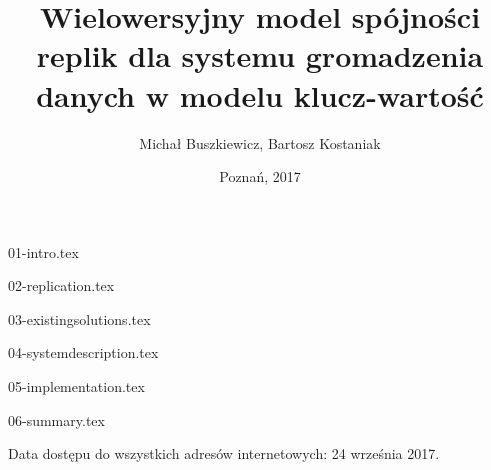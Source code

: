 \documentclass[11pt,a4paper,polish,thesis]{dcsbook}
\begin{document}
\author{Michał Buszkiewicz, Bartosz Kostaniak}
\title{Wielowersyjny model spójności replik dla systemu gromadzenia danych w modelu klucz-wartość}
\date{Poznań, 2017}
\maketitle
\frontmatter
\tableofcontents{}
\mainmatter

{01-intro.tex}

{02-replication.tex}

{03-existingsolutions.tex}

{04-systemdescription.tex}

{05-implementation.tex}


{06-summary.tex}

\backmatter


Data dostępu do wszystkich adresów internetowych: 24 września 2017.

\end{document}
